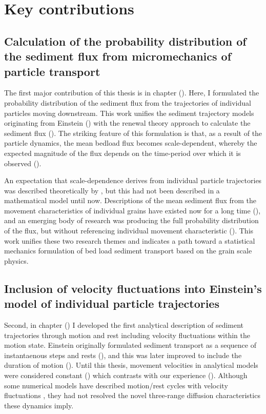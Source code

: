 \section{Key contributions}

\subsection{Calculation of the probability distribution of the sediment flux from micromechanics of particle transport}

The first major contribution of this thesis is in chapter (). Here, I formulated the probability distribution of the sediment flux from the trajectories of individual particles moving downstream. This work unifies the sediment trajectory models originating from Einstein () with the renewal theory approach to calculate the sediment flux ().
The striking feature of this formulation is that, as a result of the particle dynamics, the mean bedload flux becomes scale-dependent, whereby the expected magnitude of the flux depends on the time-period over which it is observed ().

An expectation that scale-dependence derives from individual particle trajectories was described theoretically by \citet{Ballio2018}, but this had not been described in a mathematical model until now. Descriptions of the mean sediment flux from the movement characteristics of individual grains have existed now for a long time (), and an emerging body of research was producing the full probability distribution of the flux, but without referencing individual movement characteristic (). 
This work unifies these two research themes and indicates a path toward a statistical mechanics formulation of bed load sediment transport based on the grain scale physics.

\subsection{Inclusion of velocity fluctuations into Einstein's model of individual particle trajectories}

Second, in chapter () I developed the first analytical description of sediment trajectories through motion and rest including velocity fluctuations within the motion state.
Einstein originally formulated sediment transport as a sequence of instantaenous steps and rests (), and this was later improved to include the duration of motion ().
Until this thesis, movement velocities in analytical models were considered constant () which contrasts with our experience (). 
Although some numerical models have described motion/rest cycles with velocity fluctuations \citep{Fan2016,Bialik2012,Schmeeckle2014}, they had not resolved the novel three-range diffusion characteristics these dynamics imply.

